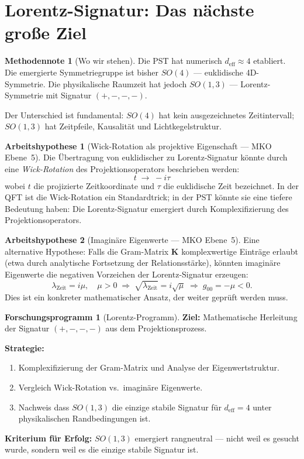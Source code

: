 \documentclass[11pt,a4paper]{article}
\theoremstyle{plain}
\theoremstyle{definition}
\newtheorem{methodennote}{Methodennote}[section]
\newtheorem{hypothese}{Arbeitshypothese}[section]
\newtheorem{programm}{Forschungsprogramm}[section]
\newcommand{\deff}{d_{\mathrm{eff}}}
\begin{document}
\section{Lorentz-Signatur: Das n\"{a}chste gro\ss{}e Ziel}

\begin{methodennote}[Wo wir stehen]
Die PST hat numerisch $\deff \approx 4$ etabliert. Die emergierte
Symmetriegruppe ist bisher $SO(4)$ --- euklidische 4D-Symmetrie.
Die physikalische Raumzeit hat jedoch $SO(1,3)$ --- Lorentz-Symmetrie
mit Signatur $(+,-,-,-)$.

Der Unterschied ist fundamental: $SO(4)$ hat kein ausgezeichnetes
Zeitintervall; $SO(1,3)$ hat Zeitpfeile, Kausalit\"{a}t und Lichtkegelstruktur.
\end{methodennote}

\begin{hypothese}[Wick-Rotation als projektive Eigenschaft --- MKO Ebene~5]
Die \"{U}bertragung von euklidischer zu Lorentz-Signatur k\"{o}nnte durch
eine \emph{Wick-Rotation} des Projektionsoperators beschrieben werden:
\[
  t \;\rightarrow\; -i\tau
\]
wobei $t$ die projizierte Zeitkoordinate und $\tau$ die euklidische Zeit
bezeichnet. In der QFT ist die Wick-Rotation ein Standardtrick;
in der PST k\"{o}nnte sie eine tiefere Bedeutung haben: Die Lorentz-Signatur
emergiert durch Komplexifizierung des Projektionsoperators.
\end{hypothese}

\begin{hypothese}[Imagin\"{a}re Eigenwerte --- MKO Ebene~5]
Eine alternative Hypothese: Falls die Gram-Matrix $\mathbf{K}$ komplexwertige
Eintr\"{a}ge erlaubt (etwa durch analytische Fortsetzung der
Relationsst\"{a}rke), k\"{o}nnten imagin\"{a}re Eigenwerte die negativen
Vorzeichen der Lorentz-Signatur erzeugen:
\[
  \lambda_{\text{Zeit}} = i\mu, \quad \mu > 0
  \;\Rightarrow\;
  \sqrt{\lambda_{\text{Zeit}}} = i\sqrt{\mu}
  \;\Rightarrow\;
  g_{00} = -\mu < 0.
\]
Dies ist ein konkreter mathematischer Ansatz, der weiter gepr\"{u}ft werden muss.
\end{hypothese}

\begin{programm}[Lorentz-Programm]
\textbf{Ziel:} Mathematische Herleitung der Signatur $(+,-,-,-)$ aus
dem Projektionsprozess.

\textbf{Strategie:}
\begin{enumerate}
  \item Komplexifizierung der Gram-Matrix und Analyse der Eigenwertstruktur.
  \item Vergleich Wick-Rotation vs.\ imagin\"{a}re Eigenwerte.
  \item Nachweis dass $SO(1,3)$ die einzige stabile Signatur f\"{u}r
        $\deff = 4$ unter physikalischen Randbedingungen ist.
\end{enumerate}

\textbf{Kriterium f\"{u}r Erfolg:} $SO(1,3)$ emergiert rangneutral
--- nicht weil es gesucht wurde, sondern weil es die einzige
stabile Signatur ist.
\end{programm}
\end{document}

